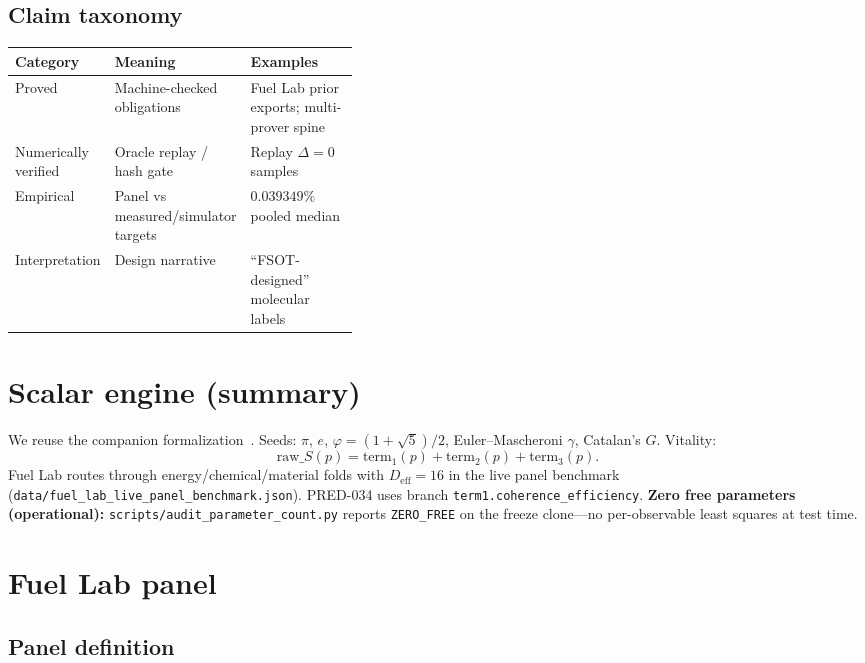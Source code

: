\documentclass[11pt,a4paper]{article}
\begin{document}
\subsection{Claim taxonomy}

\begin{center}
\begin{tabular}{@{}llp{0.4\linewidth}@{}}
\toprule
Category & Meaning & Examples \\
\midrule
Proved & Machine-checked obligations & Fuel Lab prior exports; multi-prover spine \\
Numerically verified & Oracle replay / hash gate & Replay $\Delta=0$ samples \\
Empirical & Panel vs measured/simulator targets & $0.039349\%$ pooled median \\
Interpretation & Design narrative & ``FSOT-designed'' molecular labels \\
\bottomrule
\end{tabular}
\end{center}

\section{Scalar engine (summary)}
\label{sec:engine}

We reuse the companion formalization~\cite{FSOTPaper01,FSOT21Lean}.
Seeds: $\pi$, $e$, $\varphi=(1+\sqrt{5})/2$, Euler--Mascheroni $\gamma$,
Catalan's $G$.
Vitality:
\begin{equation}
\mathrm{raw}\_S(p)=\mathrm{term}_1(p)+\mathrm{term}_2(p)+\mathrm{term}_3(p).
\end{equation}
Fuel Lab routes through energy/chemical/material folds with
$D_{\mathrm{eff}}=16$ in the live panel benchmark
(\texttt{data/fuel\_lab\_live\_panel\_benchmark.json}).
PRED-034 uses branch \texttt{term1.coherence\_efficiency}.
\textbf{Zero free parameters (operational):}
\texttt{scripts/audit\_parameter\_count.py} reports \texttt{ZERO\_FREE} on the
freeze clone---no per-observable least squares at test time.

\section{Fuel Lab panel}
\label{sec:fuel}

\subsection{Panel definition}
\end{document}
